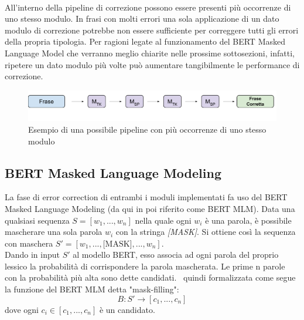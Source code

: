 \ \\
All'interno della pipeline di correzione possono essere presenti più occorrenze di uno stesso modulo. In frasi con molti errori una sola applicazione di un dato modulo di correzione potrebbe non essere sufficiente per correggere tutti gli errori della propria tipologia. Per ragioni legate al funzionamento del BERT Masked Language Model che verranno meglio chiarite nelle prossime sottosezioni, infatti, ripetere un dato modulo più volte può aumentare tangibilmente le performance di correzione.

\begin{figure}[H]
\centering
\includegraphics[width=\textwidth]{immagini/metodologia/pipeline_esempio}
\caption{Esempio di una possibile pipeline con più occorrenze di uno stesso modulo}
\label{fig:met_pipeline_esempio}
\end{figure}




\subsection{BERT Masked Language Modeling}
\label{sec:met_BERT_MLM}
La fase di error correction di entrambi i moduli implementati fa uso del BERT Masked Language Modeling (da qui in poi riferito come BERT MLM). Data una qualsiasi sequenza $S = [w_1,...,w_n]$ nella quale ogni $w_i$ è una parola, è possibile mascherare una sola parola $w_i$ con la stringa \textit{[MASK]}. Si ottiene così la sequenza con maschera $S\prime = [w_1,...,\text{[MASK]},...,w_n]$.\\
Dando in input $S\prime$ al modello BERT, esso associa ad ogni parola del proprio lessico la probabilità di corrispondere la parola mascherata. Le prime n parole con la probabilità più alta sono dette candidati.
\E\ quindi formalizzata come segue la funzione del BERT MLM detta "mask-filling":
\begin{equation} \label{eq:met_BERT}
B: S\prime \rightarrow [c_1,...,c_n]
\end{equation}
dove ogni $c_i \in[c_1,...,c_n]$ è un candidato. 

